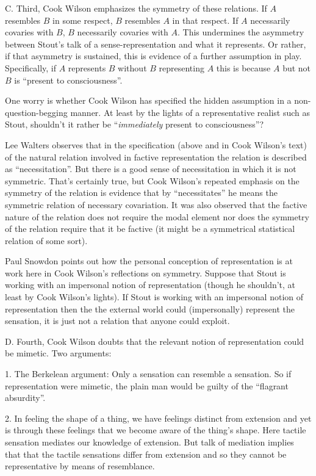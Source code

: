 \documentclass[11pt]{article}
\begin{document}
C. Third, Cook Wilson emphasizes the symmetry of these relations. If \( A \) resembles \( B \) in some respect, \( B \) resembles \( A \) in that respect. If \( A \) necessarily covaries with \( B \), \( B \) necessarily covaries with \( A \). This undermines the asymmetry between Stout's talk of a sense-representation and what it represents. Or rather, if that asymmetry is sustained, this is evidence of a further assumption in play. Specifically, if \( A \) represents \( B \) without \( B \) representing \( A \) this is because \( A \) but not \( B \) is ``present to consciousness''.

One worry is whether Cook Wilson has specified the hidden assumption in a non-question-begging manner. At least by the lights of a representative realist such as Stout, shouldn't it rather be ``\emph{immediately} present to consciousness''? 

\begin{discussion}
	Lee Walters observes that in the specification (above and in Cook Wilson's text) of the natural relation involved in factive representation the relation is described as ``necessitation''. But there is a good sense of necessitation in which it is not symmetric. That's certainly true, but Cook Wilson's repeated emphasis on the symmetry of the relation is evidence that by ``necessitates'' he means the symmetric relation of necessary covariation. It was also observed that the factive nature of the relation does not require the modal element nor does the symmetry of the relation require that it be factive (it might be a symmetrical statistical relation of some sort).

	Paul Snowdon points out how the personal conception of representation is at work here in Cook Wilson's reflections on symmetry. Suppose that Stout is working with an impersonal notion of representation (though he shouldn't, at least by Cook Wilson's lights). If Stout is working with an impersonal notion of representation then the the external world could (impersonally) represent the sensation, it is just not a relation that anyone could exploit.
\end{discussion}


D. Fourth, Cook Wilson doubts that the relevant notion of representation could be mimetic. Two arguments:

1. The Berkelean argument: Only a sensation can resemble a sensation. So if representation were mimetic, the plain man would be guilty of the ``flagrant absurdity''.

2. In feeling the shape of a thing, we have feelings distinct from extension and yet is through these feelings that we become aware of the thing's shape. Here tactile sensation mediates our knowledge of extension. But talk of mediation implies that that the tactile sensations differ from extension and so they cannot be representative by means of resemblance.
\end{document}
